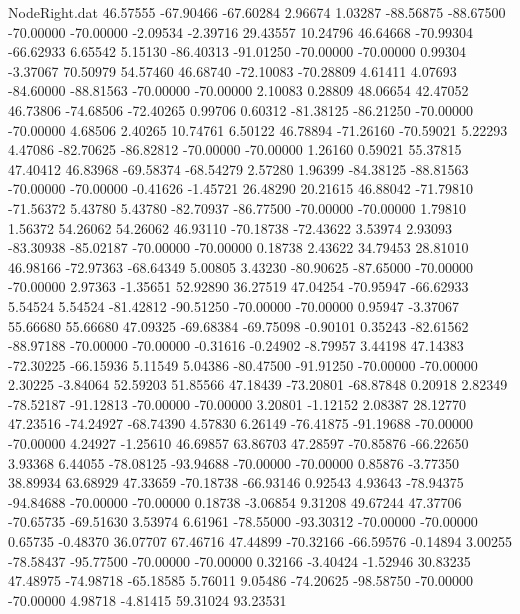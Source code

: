 \begin{filecontents}{NodeRight.dat}
  46.57555  -67.90466  -67.60284     2.96674    1.03287  -88.56875  -88.67500  -70.00000  -70.00000   -2.09534   -2.39716   29.43557   10.24796
  46.64668  -70.99304  -66.62933     6.65542    5.15130  -86.40313  -91.01250  -70.00000  -70.00000    0.99304   -3.37067   70.50979   54.57460
  46.68740  -72.10083  -70.28809     4.61411    4.07693  -84.60000  -88.81563  -70.00000  -70.00000    2.10083    0.28809   48.06654   42.47052
  46.73806  -74.68506  -72.40265     0.99706    0.60312  -81.38125  -86.21250  -70.00000  -70.00000    4.68506    2.40265   10.74761    6.50122
  46.78894  -71.26160  -70.59021     5.22293    4.47086  -82.70625  -86.82812  -70.00000  -70.00000    1.26160    0.59021   55.37815   47.40412
  46.83968  -69.58374  -68.54279     2.57280    1.96399  -84.38125  -88.81563  -70.00000  -70.00000   -0.41626   -1.45721   26.48290   20.21615
  46.88042  -71.79810  -71.56372     5.43780    5.43780  -82.70937  -86.77500  -70.00000  -70.00000    1.79810    1.56372   54.26062   54.26062
  46.93110  -70.18738  -72.43622     3.53974    2.93093  -83.30938  -85.02187  -70.00000  -70.00000    0.18738    2.43622   34.79453   28.81010
  46.98166  -72.97363  -68.64349     5.00805    3.43230  -80.90625  -87.65000  -70.00000  -70.00000    2.97363   -1.35651   52.92890   36.27519
  47.04254  -70.95947  -66.62933     5.54524    5.54524  -81.42812  -90.51250  -70.00000  -70.00000    0.95947   -3.37067   55.66680   55.66680
  47.09325  -69.68384  -69.75098    -0.90101    0.35243  -82.61562  -88.97188  -70.00000  -70.00000   -0.31616   -0.24902   -8.79957    3.44198
  47.14383  -72.30225  -66.15936     5.11549    5.04386  -80.47500  -91.91250  -70.00000  -70.00000    2.30225   -3.84064   52.59203   51.85566
  47.18439  -73.20801  -68.87848     0.20918    2.82349  -78.52187  -91.12813  -70.00000  -70.00000    3.20801   -1.12152    2.08387   28.12770
  47.23516  -74.24927  -68.74390     4.57830    6.26149  -76.41875  -91.19688  -70.00000  -70.00000    4.24927   -1.25610   46.69857   63.86703
  47.28597  -70.85876  -66.22650     3.93368    6.44055  -78.08125  -93.94688  -70.00000  -70.00000    0.85876   -3.77350   38.89934   63.68929
  47.33659  -70.18738  -66.93146     0.92543    4.93643  -78.94375  -94.84688  -70.00000  -70.00000    0.18738   -3.06854    9.31208   49.67244
  47.37706  -70.65735  -69.51630     3.53974    6.61961  -78.55000  -93.30312  -70.00000  -70.00000    0.65735   -0.48370   36.07707   67.46716
  47.44899  -70.32166  -66.59576    -0.14894    3.00255  -78.58437  -95.77500  -70.00000  -70.00000    0.32166   -3.40424   -1.52946   30.83235
  47.48975  -74.98718  -65.18585     5.76011    9.05486  -74.20625  -98.58750  -70.00000  -70.00000    4.98718   -4.81415   59.31024   93.23531

\end{filecontents}
